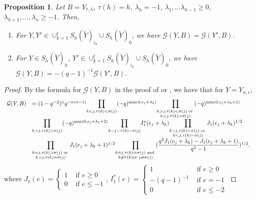 \documentclass[11pt,oneside]{amsart}
\theoremstyle{plain}
\newtheorem{proposition}[theorem]{Proposition}
\theoremstyle{definition}
\theoremstyle{remark}
\newcommand{\tx}[1]{\text{#1}}
\newcommand{\CG}{{\mathcal G}}
\numberwithin{equation}{section}
\begin{document}
	\begin{proposition}\label{proposition2.16}
		Let $B=Y_{\tau, \lambda}$, $\tau(h)=h$, $\lambda_h=-1$, $\lambda_1,\dots \lambda_{h-1} \geq 0$, $\lambda_{h+1},\dots,\lambda_n \geq -1$. Then,
		\begin{enumerate}
			\item For $Y, Y' \in \cup_{k=1}^{t} S_h(\widetilde{Y})_{i_k} \cup S_h(\widetilde{Y})_0$, we have $\CG(Y,B)=\CG(Y',B)$.
			
			\item For $Y \in S_h(\widetilde{Y})_h$, $Y' \in \cup_{k=1}^{t} S_h(\widetilde{Y})_{i_k} \cup S_h(\widetilde{Y})_0$, we have $\CG(Y,B)=-(q-1)^{-1}\CG(Y',B)$.
		\end{enumerate}
	\end{proposition}
	\begin{proof}
		By the formula for $\CG(Y,B)$ in the proof of \cite[Proposition 4.2]{Hi} or \cite[Lemma 3.8]{Cho}, we have that for $Y=Y_{\sigma,e}$,
		\begin{equation*}
			\begin{array}{ll}
				\CG(Y,B)&=(1-q^{-2})^nq^{-n(n-1)}\mathlarger{\prod}_{k<j,\tau(k)<\sigma(j)}(-q)^{\min(0,e_j+\lambda_k)}\mathlarger{\prod}_{\substack{k>j,\tau(k)<\sigma(j) \text{ or }\\k<j, \tau(k)>\sigma(j)}}(-q)^{\min(0,e_j+\lambda_k+1)}\\
				& \mathlarger{\prod}_{k>j,\tau(k)>\sigma(j)}(-q)^{\min(0,e_j+\lambda_k+2)}  \mathlarger{\prod}_{k=j=\tau(k)=\sigma(j)}I_1^*(e_j+\lambda_k)  \mathlarger{\prod}_{\substack{k=j,\tau(k)<\sigma(j)\tx{ or }\\k<j, \tau(k)=\sigma(j)}}J_1(e_j+\lambda_k)^{1/2}\\
				& \mathlarger{\prod}_{\substack{k=j,\tau(k)>\sigma(j)\tx{ or }\\k>j, \tau(k)=\sigma(j)}}J_1(e_j+\lambda_k+1)^{1/2} \mathlarger{\prod}_{\substack{k=j,\tau(k)=\sigma(j)\tx{ and }\\k \neq \tau(k) \tx{or } j \neq \sigma(j)}}(\dfrac{q^2J_1(e_j+\lambda_k)-J_1(e_j+\lambda_k+1)}{q^2-1})^{1/2},
			\end{array}
		\end{equation*}
		where $J_1(e)=\left\lbrace \begin{array}{ll} 1 & \tx{ if }e \geq 0\\ 0 &\tx{ if } e \leq -1\end{array}\right.$, $I^*_1(e)=\left\lbrace \begin{array}{ll} 1 & \tx{ if }e \geq 0\\ -(q-1)^{-1} &\tx{ if } e=-1 \\ 0& \tx{ if }e \leq -2\end{array}\right.$
		

\end{proof}
\end{document}
